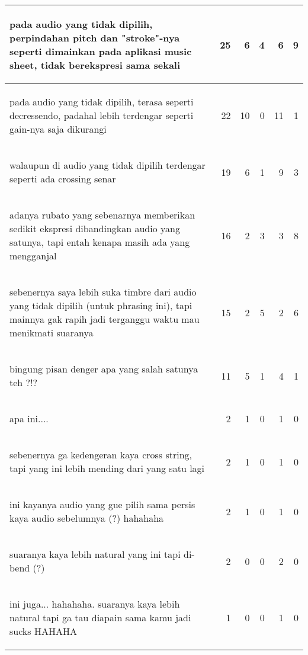 \begin{longtable}{|p{}|r|r|r|r|r|}
\begin{intabquote}pada audio yang tidak dipilih, perpindahan pitch dan "stroke"-nya seperti dimainkan pada aplikasi music sheet, tidak berekspresi sama sekali\end{intabquote}&	25&	6&	4&	6&	9\\\hline
\begin{intabquote}pada audio yang tidak dipilih, terasa seperti decressendo, padahal lebih terdengar seperti gain-nya saja dikurangi\end{intabquote}&	22&	10&	0&	11&	1\\\hline
\begin{intabquote}walaupun di audio yang tidak dipilih terdengar seperti ada crossing senar\end{intabquote}&	19&	6&	1&	9&	3\\\hline
\begin{intabquote}adanya rubato yang sebenarnya memberikan sedikit ekspresi dibandingkan audio yang satunya, tapi entah kenapa masih ada yang mengganjal\end{intabquote}&	16&	2&	3&	3&	8\\\hline
\begin{intabquote}sebenernya saya lebih suka timbre dari audio yang tidak dipilih (untuk phrasing ini), tapi mainnya gak rapih jadi terganggu waktu mau menikmati suaranya\end{intabquote}&	15&	2&	5&	2&	6\\\hline
\begin{intabquote}bingung pisan denger apa yang salah satunya teh ?!?\end{intabquote}&	11&	5&	1&	4&	1\\\hline
\begin{intabquote}apa ini....\end{intabquote}&	2&	1&	0&	1&	0\\\hline
\begin{intabquote}sebenernya ga kedengeran kaya cross string, tapi yang ini lebih mending dari yang satu lagi\end{intabquote}&	2&	1&	0&	1&	0\\\hline
\begin{intabquote}ini kayanya audio yang gue pilih sama persis kaya audio sebelumnya (?) hahahaha\end{intabquote}&	2&	1&	0&	1&	0\\\hline
\begin{intabquote}suaranya kaya lebih natural yang ini tapi di-bend (?)\end{intabquote}&	2&	0&	0&	2&	0\\\hline
\begin{intabquote}ini juga... hahahaha. suaranya kaya lebih natural tapi ga tau diapain sama kamu jadi sucks HAHAHA\end{intabquote}&	1&	0&	0&	1&	0\\\hline

	\end{longtable}